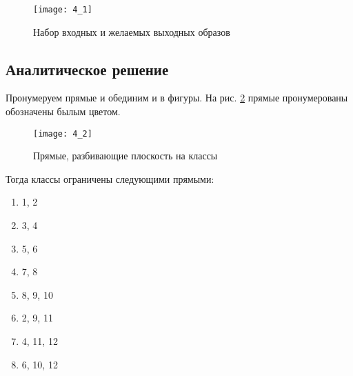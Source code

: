 \begin{figure}[H]
\begin{center}
	\texttt{[image: 4\_1]}
	\caption{Набор входных и желаемых выходных образов}
	\label{fig:4_1}
\end{center}
\end{figure}

\subsection{Аналитическое решение}


Пронумеруем прямые и обединим и в фигуры. На рис. \ref{fig:4_2} прямые пронумерованы обозначены былым цветом.
\begin{figure}[H]
\begin{center}
	\texttt{[image: 4\_2]}
	\caption{Прямые, разбивающие плоскость на классы}
	\label{fig:4_2}
\end{center}
\end{figure}

Тогда классы ограничены следующими прямыми:

\begin{multicols}{4}
\begin{enumerate}[label=\arabic*)]
	\item 1, 2
	\item 3, 4
	\item 5, 6
	\item 7, 8
	\item 8, 9, 10
	\item 2, 9, 11
	\item 4, 11, 12
	\item 6, 10, 12
\end{enumerate}
\end{multicols}


